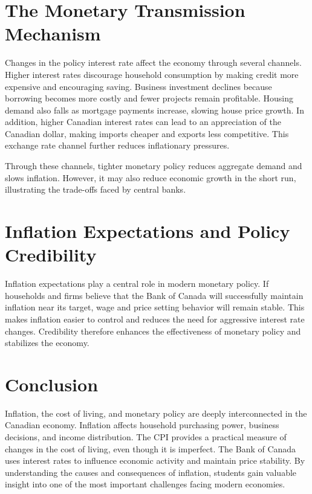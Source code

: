 \documentclass[12pt]{article}
\begin{document}
\section{The Monetary Transmission Mechanism}

Changes in the policy interest rate affect the economy through several channels. Higher interest rates discourage household consumption by making credit more expensive and encouraging saving. Business investment declines because borrowing becomes more costly and fewer projects remain profitable. Housing demand also falls as mortgage payments increase, slowing house price growth. In addition, higher Canadian interest rates can lead to an appreciation of the Canadian dollar, making imports cheaper and exports less competitive. This exchange rate channel further reduces inflationary pressures.

Through these channels, tighter monetary policy reduces aggregate demand and slows inflation. However, it may also reduce economic growth in the short run, illustrating the trade-offs faced by central banks.

\section{Inflation Expectations and Policy Credibility}

Inflation expectations play a central role in modern monetary policy. If households and firms believe that the Bank of Canada will successfully maintain inflation near its target, wage and price setting behavior will remain stable. This makes inflation easier to control and reduces the need for aggressive interest rate changes. Credibility therefore enhances the effectiveness of monetary policy and stabilizes the economy.

\section{Conclusion}

Inflation, the cost of living, and monetary policy are deeply interconnected in the Canadian economy. Inflation affects household purchasing power, business decisions, and income distribution. The CPI provides a practical measure of changes in the cost of living, even though it is imperfect. The Bank of Canada uses interest rates to influence economic activity and maintain price stability. By understanding the causes and consequences of inflation, students gain valuable insight into one of the most important challenges facing modern economies.
\newpage
\end{document}
